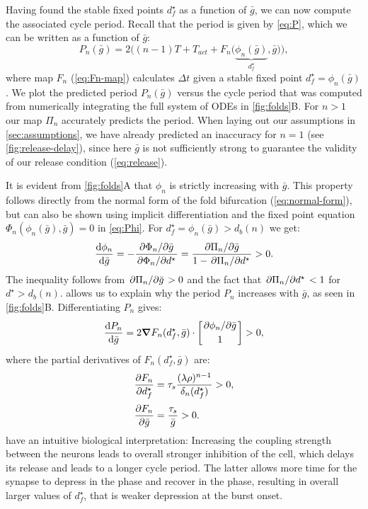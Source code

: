 Having found the stable fixed points $d^\star_f$ as a function of $\bar g$, we can now compute the associated cycle period.
Recall that the period is given by \cref{eq:P}, which we can be written as a function of $\bar g$:
\begin{equation}
	\label{eq:period}
	P_n(\bar g) = 2 \Big(
	(n-1)T + T_{act} + F_n\big(\underbrace{\phi_n(\bar g)}_{d^\star_f}, \bar g\big)
	\Big),
\end{equation}
where map $F_n$ (\cref{eq:Fn-map}) calculates $\Delta t$ given a stable fixed point $d^\star_f=\phi_n(\bar g)$.
We plot the predicted period $P_n(\bar g)$ versus the cycle period that was computed from numerically integrating the full system of ODEs in \cref{fig:folds}B.
For $n>1$ our map $\Pi_n$ accurately predicts the period.
When laying out our assumptions in \cref{sec:assumptions}, we have already predicted an inaccuracy for $n=1$ (see \cref{fig:release-delay}), since here $\bar g$ is not sufficiently strong to guarantee the validity of our release condition
(\cref{eq:release}).

It is evident from \cref{fig:folds}A that $\phi_n$ is strictly increasing with $\bar g$.
This property follows directly from the normal form of the fold bifurcation (\cref{eq:normal-form}), but can also be shown using implicit differentiation and the fixed point equation $\Phi_n(\phi_n(\bar g), \bar g)=0$ in \cref{eq:Phi}.
For $d^\star_f=\phi_n(\bar g)>d_b(n)$ we get:
\begin{equation}
	\label{dstardg:eq}
	\dv{\phi_n}{\bar g} = -\frac{\pdv*{\Phi_n}{\bar g}}{\pdv*{\Phi_n}{d^\star}} =
	\frac{\pdv*{\Pi_n}{\bar g}}{1-\pdv*{\Pi_n}{d^\star}}>0.
\end{equation}
The inequality follows from $\pdv*{\Pi_n}{\bar g}>0$ and the fact that $\pdv*{\Pi_n}{d^\star}<1$ for $d^\star>d_b(n)$.
 allows us to explain why the period $P_n$ increases with $\bar g$, as seen in \cref{fig:folds}B.
Differentiating $P_n$ gives:
\begin{equation}
	\label{eq:dPdg}
	\dv{P_{n}}{\bar g} = 2\grad F_n(d^\star_f, \bar g) \cdot
	\begin{bmatrix}\pdv*{\phi_n}{\bar g}\\[0.5ex] 1\end{bmatrix}>0,
\end{equation}
where the partial derivatives of $F_n(d^\star_f, \bar g)$ are:
\begin{align}
	\pdv{F_n}{d^\star_f} & = \tau_s \frac{(\lambda\rho)^{n-1}}{\delta_n(d^\star_f)}>0, \\[0.5ex]
	\pdv{F_n}{\bar g}    & = \frac{\tau_s}{\bar g}>0.
\end{align}
 have an intuitive biological interpretation: Increasing the coupling strength between the neurons leads to overall stronger inhibition of the \suppressed{} cell, which delays its release and leads to a longer cycle period.
The latter allows more time for the synapse to depress in the \free{} phase and recover in the \suppressed{} phase, resulting in overall larger values of $d^\star_f$, that is weaker depression at the burst onset.

